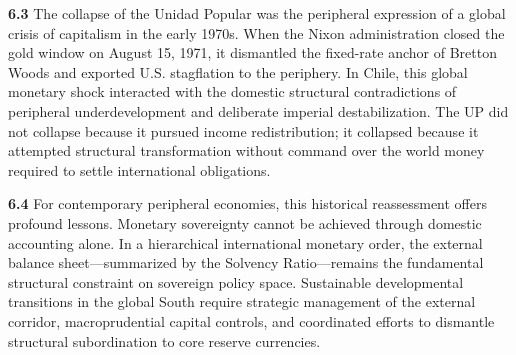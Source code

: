\textbf{6.3} The collapse of the Unidad Popular was the peripheral expression of a global crisis of capitalism in the early 1970s. When the Nixon administration closed the gold window on August 15, 1971, it dismantled the fixed-rate anchor of Bretton Woods and exported U.S. stagflation to the periphery. In Chile, this global monetary shock interacted with the domestic structural contradictions of peripheral underdevelopment and deliberate imperial destabilization. The UP did not collapse because it pursued income redistribution; it collapsed because it attempted structural transformation without command over the world money required to settle international obligations.

\textbf{6.4} For contemporary peripheral economies, this historical reassessment offers profound lessons. Monetary sovereignty cannot be achieved through domestic accounting alone. In a hierarchical international monetary order, the external balance sheet—summarized by the Solvency Ratio—remains the fundamental structural constraint on sovereign policy space. Sustainable developmental transitions in the global South require strategic management of the external corridor, macroprudential capital controls, and coordinated efforts to dismantle structural subordination to core reserve currencies.
